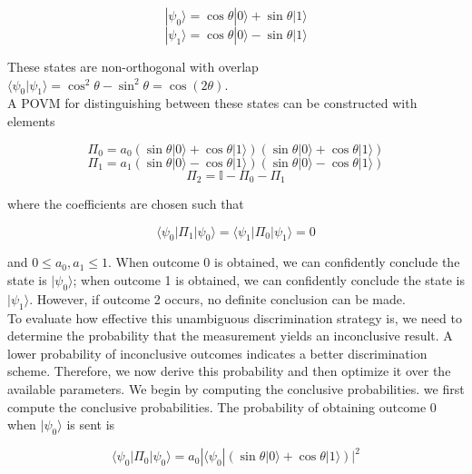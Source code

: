 \begin{equation}
    |\psi_0\rangle = \cos\theta |0\rangle + \sin\theta |1\rangle
\end{equation}
\begin{equation}
    |\psi_1\rangle = \cos\theta |0\rangle - \sin\theta |1\rangle
\end{equation}

These states are non-orthogonal with overlap $\langle\psi_0|\psi_1\rangle = \cos^2\theta - \sin^2\theta = \cos(2\theta)$.\\

A POVM for distinguishing between these states can be constructed with elements

\begin{equation}
    \Pi_0 = a_0(\sin\theta |0\rangle + \cos\theta |1\rangle)(\sin\theta |0\rangle + \cos\theta |1\rangle)
\end{equation}
\begin{equation}
    \Pi_1 = a_1(\sin\theta |0\rangle - \cos\theta |1\rangle)(\sin\theta |0\rangle - \cos\theta |1\rangle)
\end{equation}
\begin{equation}
    \Pi_2 = \mathbb{I} - \Pi_0 - \Pi_1
\end{equation}

where the coefficients are chosen such that

\begin{equation}
    \langle\psi_0|\Pi_1|\psi_0\rangle = \langle\psi_1|\Pi_0|\psi_1\rangle = 0
\end{equation}

and $0 \leq a_0, a_1 \leq 1$. When outcome 0 is obtained, we can confidently conclude the state is $|\psi_0\rangle$; when outcome 1 is obtained, we can confidently conclude the state is $|\psi_1\rangle$. However, if outcome 2 occurs, no definite conclusion can be made.\\

To evaluate how effective this unambiguous discrimination strategy is, we need to determine the probability that the measurement yields an inconclusive result. A lower probability of inconclusive outcomes indicates a better discrimination scheme. Therefore, we now derive this probability and then optimize it over the available parameters. We begin by computing the conclusive probabilities. we first compute the conclusive probabilities. The probability of obtaining outcome 0 when $|\psi_0\rangle$ is sent is

\begin{equation}
    \langle\psi_0|\Pi_0|\psi_0\rangle = a_0 |\langle\psi_0|(\sin\theta |0\rangle + \cos\theta |1\rangle)|^2
\end{equation}

